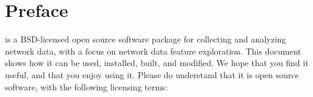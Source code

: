 \documentclass{book}
\begin{document}

\restoregeometry %
\pagecolor{white}

\frontmatter
\chapter{Preface}
 is a BSD-licensed open source software package for
collecting and analyzing network data, with a focus on network data
feature exploration.  This document shows how it can be used,
installed, built, and modified.  We hope that you find it useful, and
that you enjoy using it.  Please do understand that it is open source
software, with the following licensing terms:
\end{document}
